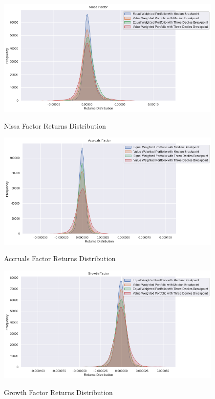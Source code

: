 \begin{figure}[H]
	\caption{Nissa Factor Returns Distribution}
	\centering
	\includegraphics[scale=.63]{../../output/figures/nissa.png}
	\label{fig:nissa}
\end{figure}

\begin{figure}[H]
	\caption{Accruals Factor Returns Distribution}
	\centering
	\includegraphics[scale=.63]{../../output/figures/accruals.png}
	\label{fig:accruals}
\end{figure}

\begin{figure}[H]
	\caption{Growth Factor Returns Distribution}
	\centering
	\includegraphics[scale=.63]{../../output/figures/growth.png}
	\label{fig:growth}
\end{figure}

